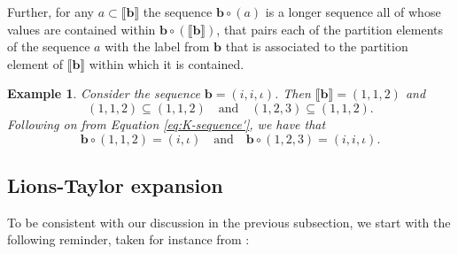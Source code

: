 \documentclass[a4paper,11pt,twoside]{article}
\numberwithin{equation}{section}
\theoremstyle{plain}
\newtheorem{example}[theorem]{Example}
\newcommand{\1}{\mathbbm{1}}
\begin{document}
	Further, for any $a \subset \llbracket \boldsymbol{b} \rrbracket$ the sequence $\boldsymbol{b}\circ(a)$ is a longer sequence all of whose values are contained within $\boldsymbol{b}\circ(\llbracket \boldsymbol{b} \rrbracket)$, that pairs each of the partition elements of the sequence $a$ with the label from $\boldsymbol{b}$ that is associated to the partition element of $\llbracket \boldsymbol{b} \rrbracket$ within which it is contained. 
	
	\begin{example}
		Consider the sequence $\boldsymbol{b}= (i, i, \iota)$. Then $\llbracket \boldsymbol{b} \rrbracket = (1,1,2)$ and
		\begin{equation*}
			(1,1,2)\subseteq (1,1,2) \quad\mbox{and}\quad (1,2,3) \subseteq (1,1,2). 
		\end{equation*} 
		Following on from Equation \eqref{eq:K-sequence'}, we have that
		\begin{equation*}
			\boldsymbol{b}\circ (1,1,2) = (i, \iota) \quad \mbox{and}\quad \boldsymbol{b}\circ (1,2,3) = (i, i, \iota). 
		\end{equation*}
	\end{example}
	
	\subsection{Lions-Taylor expansion}
	\label{subsection:Lions-TaylorEx}
	
	To be consistent with our discussion in the previous subsection, we start with the following reminder, taken for instance from \cites{buckdahn2017mean, chassagneux2014classical, CarmonaDelarue2017book1}:
	
\end{document}
